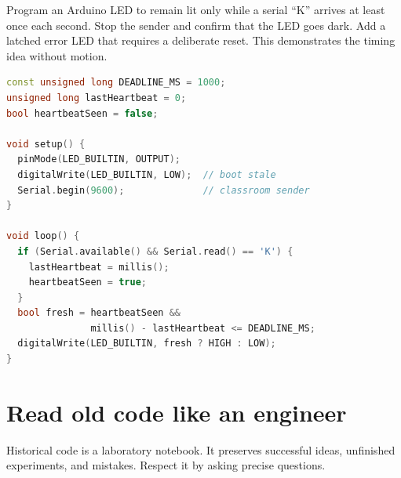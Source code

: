 \documentclass[11pt,openany]{book}
\begin{document}
\begin{buildbox}[title={WATCHDOG WITHOUT MOTORS}]
Program an Arduino LED to remain lit only while a serial ``K'' arrives at least once each second. Stop the sender and confirm that the LED goes dark. Add a latched error LED that requires a deliberate reset. This demonstrates the timing idea without motion.
\end{buildbox}

\begin{lstlisting}[language=C++,caption={A classroom heartbeat pattern using an LED.}]
const unsigned long DEADLINE_MS = 1000;
unsigned long lastHeartbeat = 0;
bool heartbeatSeen = false;

void setup() {
  pinMode(LED_BUILTIN, OUTPUT);
  digitalWrite(LED_BUILTIN, LOW);  // boot stale
  Serial.begin(9600);              // classroom sender
}

void loop() {
  if (Serial.available() && Serial.read() == 'K') {
    lastHeartbeat = millis();
    heartbeatSeen = true;
  }
  bool fresh = heartbeatSeen &&
               millis() - lastHeartbeat <= DEADLINE_MS;
  digitalWrite(LED_BUILTIN, fresh ? HIGH : LOW);
}
\end{lstlisting}


\chapter{Read old code like an engineer}

Historical code is a laboratory notebook. It preserves successful ideas, unfinished experiments, and mistakes. Respect it by asking precise questions.
\end{document}
